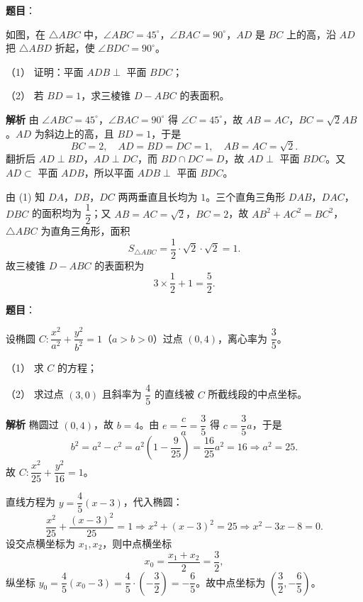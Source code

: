 \begin{answer}

\textbf{题目}：

如图，在 $\triangle ABC$ 中，$\angle ABC=45^\circ$，$\angle BAC=90^\circ$，$AD$ 是 $BC$ 上的高，沿 $AD$ 把 $\triangle ABD$ 折起，使 $\angle BDC=90^\circ$。

（1） 证明：平面 $ADB\perp$ 平面 $BDC$；

（2） 若 $BD=1$，求三棱锥 $D-ABC$ 的表面积。
\nopagebreak[4]
\begin{center}\end{center}
\nopagebreak[4]
\textbf{解析}
由 $\angle ABC=45^\circ$，$\angle BAC=90^\circ$ 得 $\angle C=45^\circ$，故 $AB=AC$，$BC=\sqrt2AB$。$AD$ 为斜边上的高，且 $BD=1$，于是
\nopagebreak[4]
\[BC=2,\quad AD=BD=DC=1,\quad AB=AC=\sqrt2.\]
翻折后 $AD\perp BD$，$AD\perp DC$，而 $BD\cap DC=D$，故 $AD\perp$ 平面 $BDC$。又 $AD\subset$ 平面 $ADB$，所以平面 $ADB\perp$ 平面 $BDC$。

由 (1) 知 $DA$，$DB$，$DC$ 两两垂直且长均为 $1$。三个直角三角形 $DAB$，$DAC$，$DBC$ 的面积均为 $\dfrac12$；又 $AB=AC=\sqrt2$，$BC=2$，故 $AB^2+AC^2=BC^2$，$\triangle ABC$ 为直角三角形，面积
\nopagebreak[4]
\[S_{\triangle ABC}=\frac12\cdot\sqrt2\cdot\sqrt2=1.\]
故三棱锥 $D-ABC$ 的表面积为
\nopagebreak[4]
\[3\times\frac12+1=\frac52.\]



\end{answer}
\begin{answer}

\textbf{题目}：

设椭圆 $C:\dfrac{x^2}{a^2}+\dfrac{y^2}{b^2}=1$（$a>b>0$）过点 $(0,4)$，离心率为 $\dfrac35$。

（1） 求 $C$ 的方程；

（2） 求过点 $(3,0)$ 且斜率为 $\dfrac45$ 的直线被 $C$ 所截线段的中点坐标。

\textbf{解析}
椭圆过 $(0,4)$，故 $b=4$。由 $e=\dfrac ca=\dfrac35$ 得 $c=\dfrac35a$，于是
\nopagebreak[4]
\[b^2=a^2-c^2=a^2\left(1-\frac9{25}\right)=\frac{16}{25}a^2=16\Longrightarrow a^2=25.\]
故 $C:\dfrac{x^2}{25}+\dfrac{y^2}{16}=1$。

直线方程为 $y=\dfrac45(x-3)$，代入椭圆：
\nopagebreak[4]
\[\frac{x^2}{25}+\frac{(x-3)^2}{25}=1\Longrightarrow x^2+(x-3)^2=25\Longrightarrow x^2-3x-8=0.\]
设交点横坐标为 $x_1,x_2$，则中点横坐标
\nopagebreak[4]
\[x_0=\frac{x_1+x_2}2=\frac32,\]
纵坐标 $y_0=\dfrac45(x_0-3)=\dfrac45\cdot\left(-\dfrac32\right)=-\dfrac65$。故中点坐标为 $\left(\dfrac32,-\dfrac65\right)$。



\end{answer}
